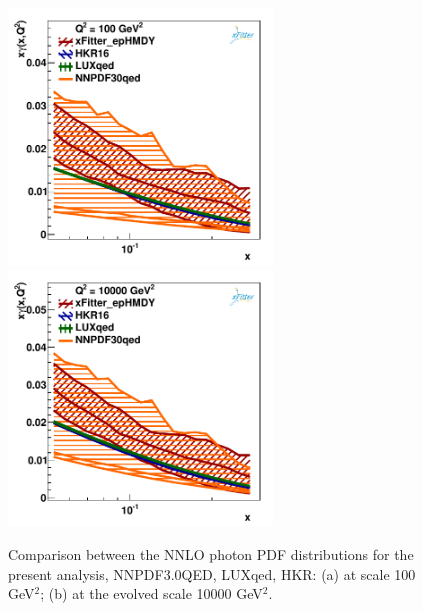 \begin{figure}
\includegraphics[width=7cm]{plots/photon_comp_100.pdf} 
\includegraphics[width=7cm]{plots/photon_comp_10000.pdf} 
\caption{Comparison between the NNLO photon PDF distributions for the present analysis, NNPDF3.0QED, LUXqed, HKR: (a) at scale 100 GeV$^{2}$; (b) at the evolved scale 10000 GeV$^{2}$.}
\label{photon_zoom}
\end{figure}

